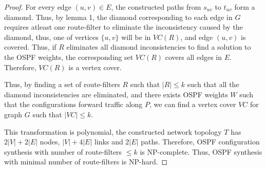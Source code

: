 \begin{proof}
For every edge $(u,v) \in E$, the constructed paths from 
$s_{uv}$ to $t_{uv}$ form a diamond. Thus, by lemma 1, 
the diamond corresponding to each edge in $G$ 
requires atleast one route-filter to eliminate
the inconsistency caused by the diamond, thus, one 
of vertices $\{u,v\}$ will be in $VC(R)$, and edge $(u,v)$
is covered. Thus, if $R$ eliminates all diamond inconsistencies
to find a solution to the OSPF weights, the corresponding set
$VC(R)$ covers all edges in $E$. Therefore, $VC(R)$ is a vertex
cover. 

Thus, by finding a set of route-filters $R$ such that $|R| \leq k$
such that all the diamond inconsistencies are eliminated, and there
exists OSPF weights $W$ such that the configurations forward traffic
along $P$, we can find a vertex cover $VC$ for graph $G$ such that
$|VC| \leq k$. 

This transformation is polynomial, the constructed 
network topology $T$ has $2|V| + 2|E|$ nodes, 
$|V| + 4|E|$ links and $2|E|$ paths. Therefore, OSPF
configuration synthesis with number of route-filters $\leq k$ is
NP-complete. Thus, OSPF synthesis with minimal number of 
route-filters is NP-hard. 
\end{proof}
